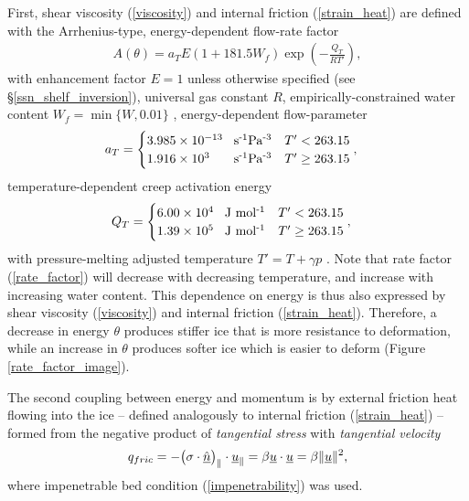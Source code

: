 First, shear viscosity (\ref{viscosity}) and internal friction (\ref{strain_heat}) are defined with the Arrhenius-type, energy-dependent flow-rate factor  
\begin{align}
  \label{rate_factor}
  A(\theta) = a_T E \left( 1 + 181.5 W_f \right) \exp\left(-\frac{Q_T}{RT'} \right),
\end{align}
with enhancement factor $E = 1$ unless otherwise specified (see \S \ref{ssn_shelf_inversion}), universal gas constant $R$, empirically-constrained water content $W_f = \min\{W, 0.01\}$ \citep{paterson_1994}, energy-dependent flow-parameter \citep{paterson_1982}
\begin{align}
  \label{flow_parameter}
  a_T &= \begin{cases}
           3.985 \times 10^{-13} \hspace{3mm} \text{s\ensuremath{^{\textrm{-1}}}Pa\ensuremath{^{\textrm{-3}}}} & T' < 263.15 \\
           1.916 \times 10^{3\hphantom{-1}} \hspace{3mm} \text{s\ensuremath{^{\textrm{-1}}}Pa\ensuremath{^{\textrm{-3}}}} & T' \geq 263.15 \\
         \end{cases},
\end{align}
temperature-dependent creep activation energy 
\begin{align}
  \label{activation_energy}
  Q_T & = \begin{cases}
            6.00 \times 10^{4} \hspace{3mm} \text{J mol\ensuremath{^{\textrm{-1}}}} & T' < 263.15 \\
            1.39 \times 10^{5} \hspace{3mm} \text{J mol\ensuremath{^{\textrm{-1}}}} & T' \geq 263.15 \\
          \end{cases},
\end{align}
with pressure-melting adjusted temperature $T' = T + \gamma p$ \citep{greve_2014}.  Note that rate factor (\ref{rate_factor}) will decrease with decreasing temperature, and increase with increasing water content.  This dependence on energy is thus also expressed by shear viscosity (\ref{viscosity}) and internal friction (\ref{strain_heat}).  Therefore, a decrease in energy $\theta$ produces stiffer ice that is more resistance to deformation, while an increase in $\theta$ produces softer ice which is easier to deform (Figure \ref{rate_factor_image}).

The second coupling between energy and momentum is by external friction heat flowing into the ice -- defined analogously to internal friction (\ref{strain_heat}) -- formed from the negative product of \emph{tangential stress} with \emph{tangential velocity} \citep{greve_2009}
\begin{align}
  \label{basal_friction_heat}
  q_{fric} = -\big( \sigma \cdot \underline{\hat{n}} \big)_{\Vert} \cdot \underline{u}_{\Vert} = \beta \underline{u} \cdot \underline{u} = \beta \Vert \underline{u} \Vert^2,
\end{align}
where impenetrable bed condition (\ref{impenetrability}) was used.

